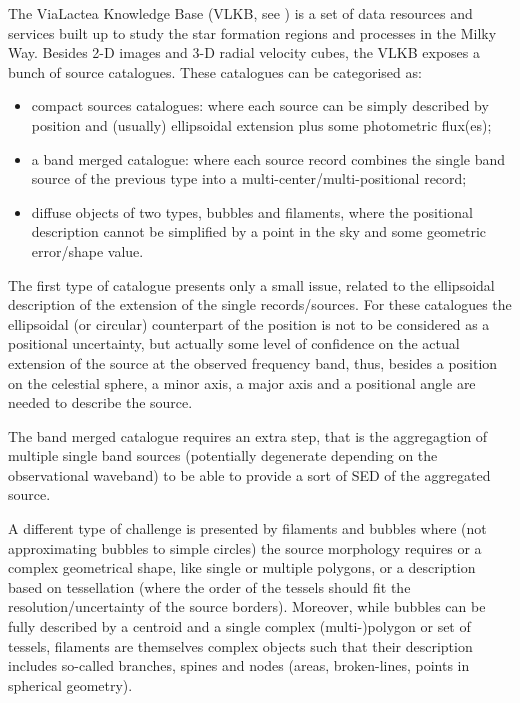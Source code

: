 The ViaLactea Knowledge Base (VLKB, see \cite{2016SPIE.9913E..0HM}) is a set of data
resources and services built up to study the star formation regions and
processes in the Milky Way. Besides 2-D images and 3-D radial velocity
cubes, the VLKB exposes a bunch of source catalogues. These catalogues
can be categorised as:

\begin{itemize}
	\item compact sources catalogues: where each source can be simply
described by position and (usually) ellipsoidal extension plus some
photometric flux(es);
	\item a band merged catalogue: where each source record combines the
single band source of the previous type into a
multi-center/multi-positional record;
	\item diffuse objects of two types, bubbles and filaments, where the
positional description cannot be simplified by a point in the sky and
some geometric error/shape value.
\end{itemize}

The first type of catalogue presents only a small issue, related to the
ellipsoidal description of the extension of the single records/sources.
For these catalogues the ellipsoidal (or circular) counterpart of the position is not
to be considered as a positional uncertainty, but actually some level of
confidence on the actual extension of the source at the observed
frequency band, thus, besides a position on the celestial sphere, a minor axis,
a major axis and a positional angle are needed to describe the source.

The band merged catalogue requires an extra step, that is the
aggregagtion of multiple single band sources (potentially degenerate
depending on the observational waveband) to be able to provide a sort
of SED of the aggregated source.

A different type of challenge is presented by filaments and bubbles
where (not approximating bubbles to simple circles) the source
morphology requires or a complex geometrical shape, like single or
multiple polygons, or a description based on tessellation (where the
order of the tessels should fit the resolution/uncertainty of the source
borders). Moreover, while bubbles can be fully described by a centroid
and a single complex (multi-)polygon or set of tessels, filaments are
themselves complex objects such that their description includes
so-called branches, spines and nodes (areas, broken-lines, points in
spherical geometry).

